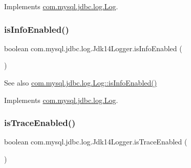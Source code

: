 Implements \mbox{\hyperlink{interfacecom_1_1mysql_1_1jdbc_1_1log_1_1_log_acc3f527d8a1e3143e312eb4368c3632a}{com.\+mysql.\+jdbc.\+log.\+Log}}.

\mbox{\label{classcom_1_1mysql_1_1jdbc_1_1log_1_1_jdk14_logger_aeab4dbb0e0a551d27dfd1b9bd6df5322}} 
\subsubsection{\texorpdfstring{is\+Info\+Enabled()}{isInfoEnabled()}}
{\footnotesize\ttfamily boolean com.\+mysql.\+jdbc.\+log.\+Jdk14\+Logger.\+is\+Info\+Enabled (\begin{DoxyParamCaption}{ }\end{DoxyParamCaption})}

\begin{DoxySeeAlso}{See also}
\mbox{\hyperlink{interfacecom_1_1mysql_1_1jdbc_1_1log_1_1_log_a8ca112798ee938dfb0fa06ffca504922}{com.\+mysql.\+jdbc.\+log.\+Log\+::is\+Info\+Enabled()}} 
\end{DoxySeeAlso}


Implements \mbox{\hyperlink{interfacecom_1_1mysql_1_1jdbc_1_1log_1_1_log_a8ca112798ee938dfb0fa06ffca504922}{com.\+mysql.\+jdbc.\+log.\+Log}}.

\mbox{\label{classcom_1_1mysql_1_1jdbc_1_1log_1_1_jdk14_logger_a02f8d0f49784473a5c5250184001091a}} 
\subsubsection{\texorpdfstring{is\+Trace\+Enabled()}{isTraceEnabled()}}
{\footnotesize\ttfamily boolean com.\+mysql.\+jdbc.\+log.\+Jdk14\+Logger.\+is\+Trace\+Enabled (\begin{DoxyParamCaption}{ }\end{DoxyParamCaption})}

